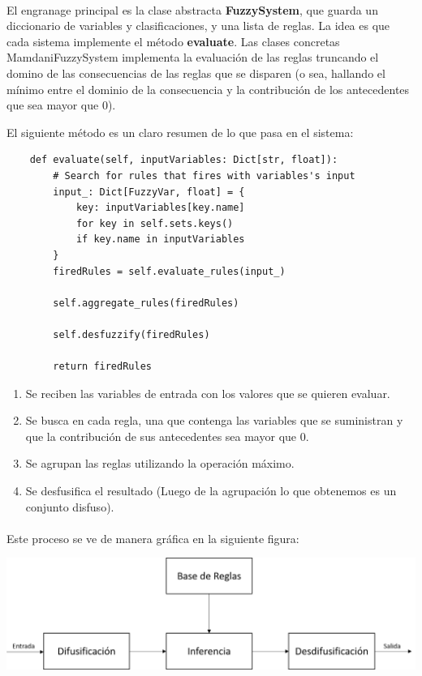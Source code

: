 \documentclass[a4paper, 12pt]{article}
\begin{document}
\paragraph{}
El engranage principal es la clase abstracta \textbf{FuzzySystem}, que guarda un diccionario de variables
y clasificaciones, y una lista de reglas. La idea es que cada sistema implemente el m\'etodo \textbf{evaluate}.
Las clases concretas MamdaniFuzzySystem implementa la evaluaci\'on de las reglas truncando el domino de 
las consecuencias de las reglas que se disparen (o sea, hallando el m\'inimo entre el dominio de la consecuencia
y la contribuci\'on de los antecedentes que sea mayor que 0).

El siguiente m\'etodo es un claro resumen de lo que pasa en el sistema:

\begin{verbatim}
    def evaluate(self, inputVariables: Dict[str, float]):
        # Search for rules that fires with variables's input
        input_: Dict[FuzzyVar, float] = {
            key: inputVariables[key.name]
            for key in self.sets.keys()
            if key.name in inputVariables
        }
        firedRules = self.evaluate_rules(input_)

        self.aggregate_rules(firedRules)

        self.desfuzzify(firedRules)

        return firedRules
\end{verbatim}

\begin{enumerate}
    \item Se reciben las variables de entrada con los valores que se quieren evaluar.
    \item Se busca en cada regla, una que contenga las variables que se suministran y que la contribuci\'on de sus antecedentes sea mayor que 0.
    \item Se agrupan las reglas utilizando la operaci\'on m\'aximo.
    \item Se desfusifica el resultado (Luego de la agrupaci\'on lo que obtenemos es un conjunto disfuso).
\end{enumerate}

\paragraph{}
Este proceso se ve de manera gr\'afica en la siguiente figura:

\includegraphics[scale=0.3]{graph.png}
\end{document}
